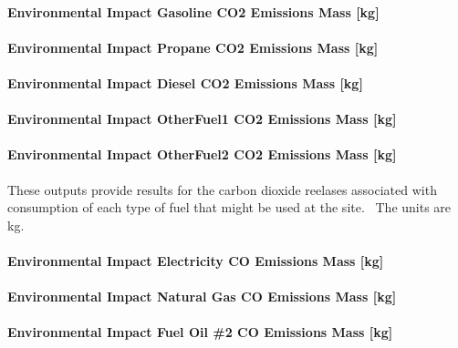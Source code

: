 \paragraph{Environmental Impact Gasoline CO2 Emissions Mass {[}kg{]}}\label{environmental-impact-gasoline-co2-emissions-mass-kg}

\paragraph{Environmental Impact Propane CO2 Emissions Mass {[}kg{]}}\label{environmental-impact-propane-co2-emissions-mass-kg}

\paragraph{Environmental Impact Diesel CO2 Emissions Mass {[}kg{]}}\label{environmental-impact-diesel-co2-emissions-mass-kg}

\paragraph{Environmental Impact OtherFuel1 CO2 Emissions Mass {[}kg{]}}\label{environmental-impact-otherfuel1-co2-emissions-mass-kg}

\paragraph{Environmental Impact OtherFuel2 CO2 Emissions Mass {[}kg{]}}\label{environmental-impact-otherfuel2-co2-emissions-mass-kg}

These outputs provide results for the carbon dioxide reelases associated with consumption of each type of fuel that might be used at the site.~ The units are kg.

\paragraph{Environmental Impact Electricity CO Emissions Mass {[}kg{]}}\label{environmental-impact-electricity-co-emissions-mass-kg}

\paragraph{Environmental Impact Natural Gas CO Emissions Mass {[}kg{]}}\label{environmental-impact-natural-gas-co-emissions-mass-kg}

\paragraph{Environmental Impact Fuel Oil \#2 CO Emissions Mass {[}kg{]}}\label{environmental-impact-fuel-oil-2-co-emissions-mass-kg}

